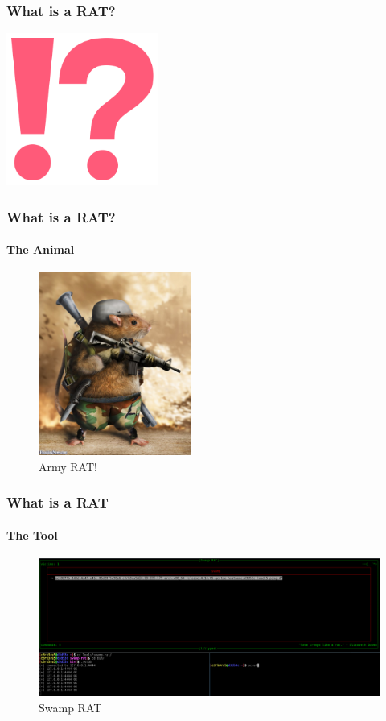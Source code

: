\documentclass[aspectratio=169]{beamer}
\begin{document}
\begin{frame}
  \frametitle{What is a RAT?}
  \begin{center}
    \includegraphics[width=5cm,keepaspectratio]{question_mark}
  \end{center}
\end{frame}

\begin{frame}
  \frametitle{What is a RAT?}
  \framesubtitle{The Animal}
  \begin{center}
    \begin{figure}
      \includegraphics[width=5cm,keepaspectratio]{rat_animal}
      \caption{Army RAT!}
    \end{figure}
  \end{center}
\end{frame}

\begin{frame}
  \frametitle{What is a RAT}
  \framesubtitle{The Tool}
  \begin{center}
    \begin{figure}
      \includegraphics[width=14cm,keepaspectratio]{rat_tool}
      \caption{Swamp RAT}
    \end{figure}
  \end{center}
\end{frame}
\end{document}
